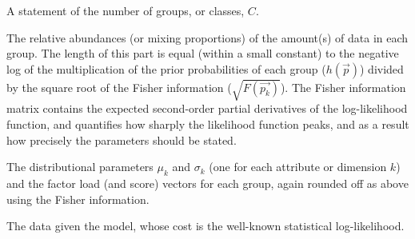 \documentclass{elsarticle}
\begin{document}
\begin{itemize}
	{\setlength\itemindent{5mm}\item[\textbf{1a)}] A statement of the number of groups, or classes, $C$.}
	
	{\setlength\itemindent{5mm}\item[\textbf{1b)}] The relative abundances (or mixing proportions) of the amount(s) of data in each group. 
		The length of this 
		part is equal (within a small constant) to the negative log of the multiplication of the prior probabilities
		of each group ($h(\vec{p})$) divided by the square root of the Fisher information ($\sqrt{F(\vec{p_k})}$). 
		The Fisher information matrix contains the expected second-order partial derivatives of the log-likelihood function, and quantifies how sharply the likelihood function peaks, and as a result how precisely the parameters should be stated.}
	
	{\setlength\itemindent{5mm}\item[\textbf{1c)}] The distributional parameters $\mu_k$ and $\sigma_k$ 
		(one for each attribute or dimension  $k$) and the factor
		load (and score) vectors for each group, again rounded off as above using the Fisher information.}
	
	{\setlength\itemindent{5mm}\item[\textbf{2)}] The data given the model, whose cost is the well-known statistical log-likelihood. }
\end{itemize}
\end{document}
